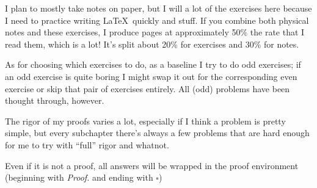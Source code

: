\maketitle

\hypersetup{linkcolor=black, urlcolor=black, citecolor=black}
\tableofcontents
\clearpage
\hypersetup{linkcolor=blue, urlcolor=blue, citecolor=blue}

I plan to mostly take notes on paper, but I will a lot of the exercises here because I need to practice writing \LaTeX \ quickly and stuff. If you combine both physical notes and these exercises, I produce pages at approximately 50\% the rate that I read them, which is a lot! It's split about 20\% for exercises and 30\% for notes.

As for choosing which exercises to do, as a baseline I try to do odd exercises; if an odd exercise is quite boring I might swap it out for the corresponding even exercise or skip that pair of exercises entirely. All (odd) problems have been thought through, however.

The rigor of my proofs varies a lot, especially if I think a problem is pretty simple, but every subchapter there's always a few problems that are hard enough for me to try with ``full'' rigor and whatnot.

Even if it is not a proof, all answers will be wrapped in the proof environment (beginning with \emph{Proof.} and ending with $\square$)
